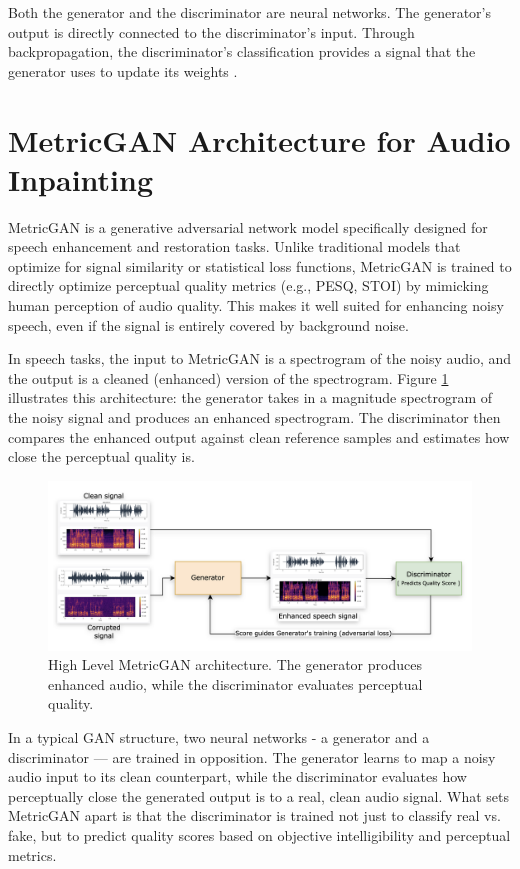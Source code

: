 Both the generator and the discriminator are neural networks. The generator's output is directly connected to the discriminator's input. Through backpropagation, the discriminator's classification provides a signal that the generator uses to update its weights \cite{metricgan}.

\section{MetricGAN Architecture for Audio Inpainting}

MetricGAN is a generative adversarial network model specifically designed for speech enhancement and restoration tasks. Unlike traditional models that optimize for signal similarity or statistical loss functions, MetricGAN is trained to directly optimize perceptual quality metrics (e.g., PESQ, STOI) by mimicking human perception of audio quality. This makes it well suited for enhancing noisy speech, even if the signal is entirely covered by background noise.

In speech tasks, the input to MetricGAN is a spectrogram of the noisy audio, and the output is a cleaned (enhanced) version of the spectrogram. Figure \ref{fig:figure5} illustrates this architecture: the generator takes in a magnitude spectrogram of the noisy signal and produces an enhanced spectrogram. The discriminator then compares the enhanced output against clean reference samples and estimates how close the perceptual quality is.

\begin{figure}[htbp]
    \centering
    \includegraphics[width=1\linewidth]{figures/MetricGAN.png}
     \caption{High Level MetricGAN architecture. The generator produces enhanced audio, while the discriminator evaluates perceptual quality.}
    \label{fig:figure5}
\end{figure}

In a typical GAN structure, two neural networks - a generator and a discriminator — are trained in opposition. The generator learns to map a noisy audio input to its clean counterpart, while the discriminator evaluates how perceptually close the generated output is to a real, clean audio signal. What sets MetricGAN apart is that the discriminator is trained not just to classify real vs. fake, but to predict quality scores based on objective intelligibility and perceptual metrics.

